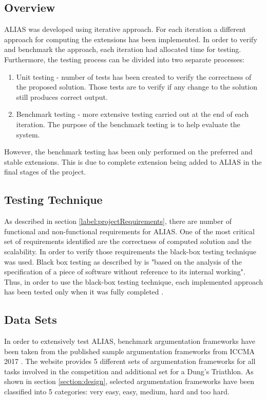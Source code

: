 \subsection{Overview}
ALIAS was developed using iterative approach. For each iteration a different approach for computing the extensions has been implemented. In order to verify and benchmark the approach, each iteration had allocated time for testing. Furthermore, the testing process can be divided into two separate processes: 
\begin{enumerate}
	\item Unit testing - number of tests has been created to verify the correctness of the proposed solution. Those tests are to verify if any change to the solution still produces correct output. 
	\item Benchmark testing - more extensive testing carried out at the end of each iteration. The purpose of the benchmark testing is to help evaluate the system. 
\end{enumerate}
However, the benchmark testing has been only performed on the preferred and stable extensions. This is due to complete extension being added to ALIAS in the final stages of the project.

\subsection{Testing Technique}
As described in section \ref{label:projectRequirements}, there are number of functional and non-functional requirements for ALIAS. One of the most critical set of requirements identified are the correctness of computed solution and the scalability. In order to verify those requirements the black-box testing technique was used. Black box testing as described by \citet{testing2} is "based on the analysis of the specification of a piece of software without reference to its internal working". Thus, in order to use the black-box testing technique, each implemented approach has been tested only when it was fully completed \citep{blackbox}.

\subsection{Data Sets}
In order to extensively test ALIAS, benchmark argumentation frameworks have been taken from the published sample argumentation frameworks from ICCMA 2017 \citep{iccmaResults}. The website provides 5 different sets of argumentation frameworks for all tasks involved in the competition and additional set for a Dung's Triathlon. As shown in section \ref{section:design}, selected argumentation frameworks have been classified into 5 categories: very easy, easy, medium, hard and too hard. 

